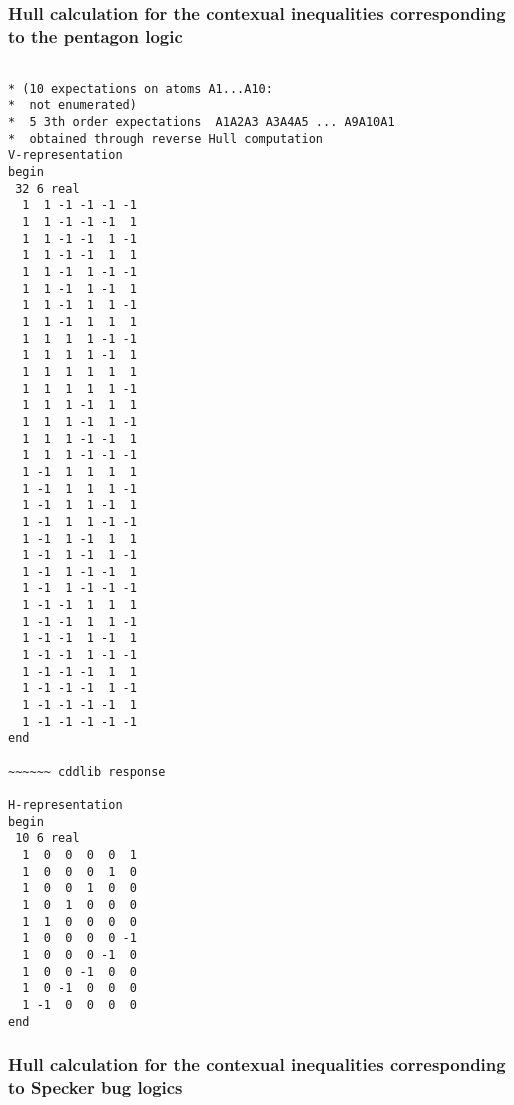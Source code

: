 \documentclass[%
 showpacs,
 showkeys,
 preprintnumbers,
 amsmath,amssymb,
 aps,
  pra,
  longbibliography,
 floatfix,
 ]{revtex4-1}
\begin{document}
\subsubsection{Hull calculation for the contexual inequalities corresponding to the pentagon logic}

{ \begin{lstlisting}[backgroundcolor=\color{yellow!10},framerule=0pt,breaklines=true, frame=tb]

* (10 expectations on atoms A1...A10:
*  not enumerated)
*  5 3th order expectations  A1A2A3 A3A4A5 ... A9A10A1
*  obtained through reverse Hull computation
V-representation
begin
 32 6 real
  1  1 -1 -1 -1 -1
  1  1 -1 -1 -1  1
  1  1 -1 -1  1 -1
  1  1 -1 -1  1  1
  1  1 -1  1 -1 -1
  1  1 -1  1 -1  1
  1  1 -1  1  1 -1
  1  1 -1  1  1  1
  1  1  1  1 -1 -1
  1  1  1  1 -1  1
  1  1  1  1  1  1
  1  1  1  1  1 -1
  1  1  1 -1  1  1
  1  1  1 -1  1 -1
  1  1  1 -1 -1  1
  1  1  1 -1 -1 -1
  1 -1  1  1  1  1
  1 -1  1  1  1 -1
  1 -1  1  1 -1  1
  1 -1  1  1 -1 -1
  1 -1  1 -1  1  1
  1 -1  1 -1  1 -1
  1 -1  1 -1 -1  1
  1 -1  1 -1 -1 -1
  1 -1 -1  1  1  1
  1 -1 -1  1  1 -1
  1 -1 -1  1 -1  1
  1 -1 -1  1 -1 -1
  1 -1 -1 -1  1  1
  1 -1 -1 -1  1 -1
  1 -1 -1 -1 -1  1
  1 -1 -1 -1 -1 -1
end

~~~~~~ cddlib response

H-representation
begin
 10 6 real
  1  0  0  0  0  1
  1  0  0  0  1  0
  1  0  0  1  0  0
  1  0  1  0  0  0
  1  1  0  0  0  0
  1  0  0  0  0 -1
  1  0  0  0 -1  0
  1  0  0 -1  0  0
  1  0 -1  0  0  0
  1 -1  0  0  0  0
end

\end{lstlisting}  }

\subsubsection{Hull calculation for the contexual inequalities corresponding to Specker bug logics}
\end{document}
